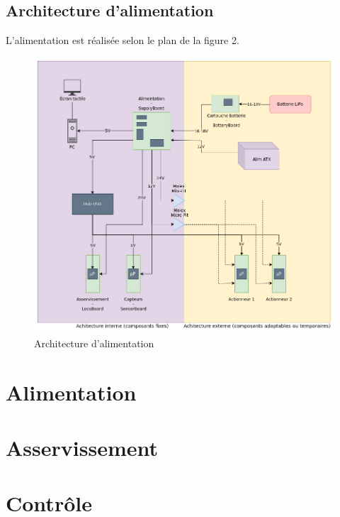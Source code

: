 \documentclass[a4paper,10pt]{refart}
\begin{document}
\subsection{Architecture d'alimentation}
	L'alimentation est réalisée selon le plan de la figure 2.
	\begin{figure}[h]
		\caption{Architecture d'alimentation}
		\centering
		\includegraphics[width=1\textwidth]{pictures/arch_alim}
	\end{figure}
	
	

\section{Alimentation}

\section{Asservissement}

\section{Contrôle}
\end{document}
